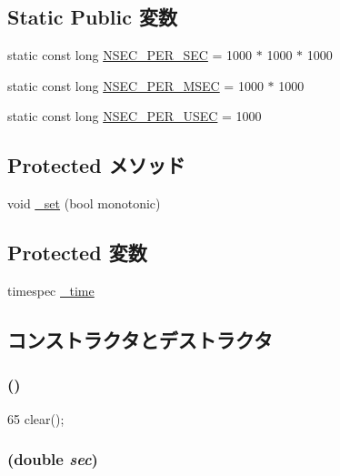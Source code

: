 \subsection*{Static Public 変数}
\begin{DoxyCompactItemize}
\item 
static const long \hyperlink{classTime_acf39b97318b2d461688089128187619b}{NSEC\_\-PER\_\-SEC} = 1000 $\ast$ 1000 $\ast$ 1000
\item 
static const long \hyperlink{classTime_a834c9f01d049ca7566760e3e176bebd3}{NSEC\_\-PER\_\-MSEC} = 1000 $\ast$ 1000
\item 
static const long \hyperlink{classTime_a96e26292451055de6e9acb621fe78dfc}{NSEC\_\-PER\_\-USEC} = 1000
\end{DoxyCompactItemize}
\subsection*{Protected メソッド}
\begin{DoxyCompactItemize}
\item 
void \hyperlink{classTime_a6f54fb7317f085502129d0ddab987526}{\_\-set} (bool monotonic)
\end{DoxyCompactItemize}
\subsection*{Protected 変数}
\begin{DoxyCompactItemize}
\item 
timespec \hyperlink{classTime_add42e751e54ea2991eda24784f271e51}{\_\-time}
\end{DoxyCompactItemize}


\subsection{コンストラクタとデストラクタ}
\hypertarget{classTime_a38b0285424ae98cbe324c635b300c750}{
\subsubsection[{Time}]{ ()}}
\label{classTime_a38b0285424ae98cbe324c635b300c750}



\begin{DoxyCode}
65 { clear(); }
\end{DoxyCode}
\hypertarget{classTime_aa42c586875ce57c957e701b206fef15f}{
\subsubsection[{Time}]{ (double {\em sec})}}
\label{classTime_aa42c586875ce57c957e701b206fef15f}



